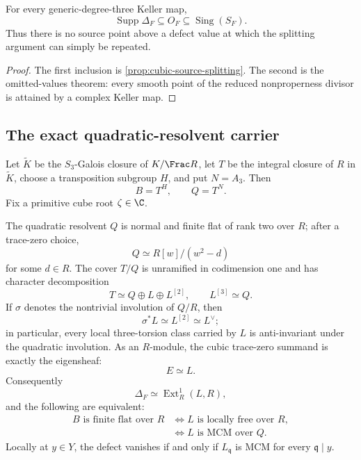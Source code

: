 \begin{corollary}
\label{cor:cubic-defect-support}
For every generic-degree-three Keller map,
\[
\operatorname{Supp}\Delta_F\subseteq O_F\subseteq\operatorname{Sing}(S_F).
\]
Thus there is no source point above a defect value at which the splitting
argument can simply be repeated.
\end{corollary}

\begin{proof}
The first inclusion is \cref{prop:cubic-source-splitting}.  The second is the
omitted-values theorem: every smooth point of the reduced nonproperness divisor
is attained by a complex Keller map.
\end{proof}

\subsection{The exact quadratic-resolvent carrier}

Let \(\widetilde K\) be the \(S_3\)-Galois closure of \(K/\Frac R\), let \(T\)
be the integral closure of \(R\) in \(\widetilde K\), choose a transposition
subgroup \(H\), and put \(N=A_3\).  Then
\[
B=T^H,\qquad Q=T^N.
\]
Fix a primitive cube root \(\zeta\in\C\).

\begin{theorem}
\label{thm:exact-resolvent-carrier}
The quadratic resolvent \(Q\) is normal and finite flat of rank two over
\(R\); after a trace-zero choice,
\[
Q\simeq R[w]/(w^2-d)
\]
for some \(d\in R\).  The cover \(T/Q\) is unramified in codimension one and
has character decomposition
\[
T\simeq Q\oplus L\oplus L^{[2]},
\qquad L^{[3]}\simeq Q.
\]
If \(\sigma\) denotes the nontrivial involution of \(Q/R\), then
\[
\sigma^*L\simeq L^{[2]}\simeq L^\vee;
\]
in particular, every local three-torsion class carried by \(L\) is
anti-invariant under the quadratic involution.  As an \(R\)-module, the
cubic trace-zero summand is exactly the eigensheaf:
\[
E\simeq L.
\]
Consequently
\[
\Delta_F\simeq\operatorname{Ext}^1_R(L,R),
\]
and the following are equivalent:
\[
\begin{aligned}
B\text{ is finite flat over }R
&\Longleftrightarrow L\text{ is locally free over }R,\\
&\Longleftrightarrow L\text{ is MCM over }Q.
\end{aligned}
\]
Locally at \(y\in Y\), the defect vanishes if and only if
\(L_\mathfrak q\) is MCM for every \(\mathfrak q\mid y\).
\end{theorem}

